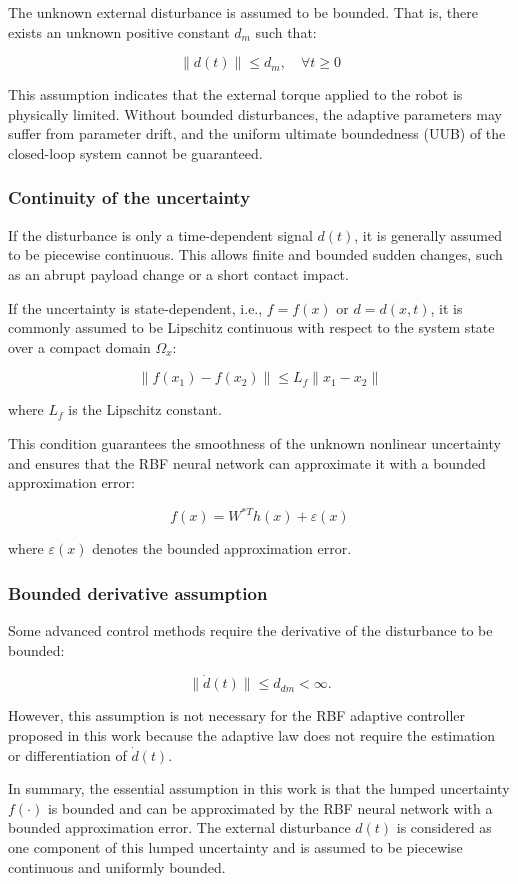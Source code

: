 The unknown external disturbance is assumed to be bounded. That is, there exists an unknown positive constant $d_m$ such that:

\[
\|d(t)\|\leq d_m,\quad \forall t\geq0
\]

This assumption indicates that the external torque applied to the robot is physically limited. Without bounded disturbances, the adaptive parameters may suffer from parameter drift, and the uniform ultimate boundedness (UUB) of the closed-loop system cannot be guaranteed.


\subsubsection{Continuity of the uncertainty}

If the disturbance is only a time-dependent signal $d(t)$, it is generally assumed to be piecewise continuous. This allows finite and bounded sudden changes, such as an abrupt payload change or a short contact impact.

If the uncertainty is state-dependent, i.e., $f=f(x)$ or $d=d(x,t)$, it is commonly assumed to be Lipschitz continuous with respect to the system state over a compact domain $\Omega_x$:

\[
\|f(x_1)-f(x_2)\|
\leq L_f\|x_1-x_2\|
\]

where $L_f$ is the Lipschitz constant.

This condition guarantees the smoothness of the unknown nonlinear uncertainty and ensures that the RBF neural network can approximate it with a bounded approximation error:

\[
f(x)=W^{*T}h(x)+\varepsilon(x)
\]

where $\varepsilon(x)$ denotes the bounded approximation error.


\subsubsection{Bounded derivative assumption}

Some advanced control methods require the derivative of the disturbance to be bounded:

\[
\|\dot d(t)\|\leq d_{dm}<\infty .
\]

However, this assumption is not necessary for the RBF adaptive controller proposed in this work because the adaptive law does not require the estimation or differentiation of $\dot d(t)$.


In summary, the essential assumption in this work is that the lumped uncertainty $f(\cdot)$ is bounded and can be approximated by the RBF neural network with a bounded approximation error. The external disturbance $d(t)$ is considered as one component of this lumped uncertainty and is assumed to be piecewise continuous and uniformly bounded.

